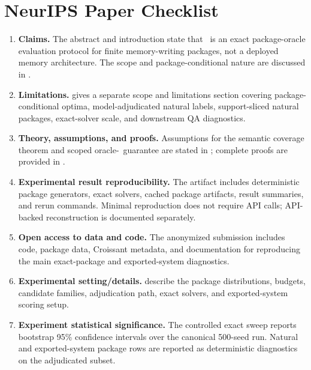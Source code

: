 \section*{NeurIPS Paper Checklist}

\begin{enumerate}[leftmargin=1.5em,itemsep=4pt]
\item \textbf{Claims.} \answerYes{} The abstract and introduction state that \method\ is an exact package-oracle evaluation protocol for finite memory-writing packages, not a deployed memory architecture. The scope and package-conditional nature are discussed in .

\item \textbf{Limitations.} \answerYes{}  gives a separate scope and limitations section covering package-conditional optima, model-adjudicated natural labels, support-sliced natural packages, exact-solver scale, and downstream QA diagnostics.

\item \textbf{Theory, assumptions, and proofs.} \answerYes{} Assumptions for the semantic coverage theorem and scoped oracle-\compiler\ guarantee are stated in ; complete proofs are provided in .

\item \textbf{Experimental result reproducibility.} \answerYes{} The artifact includes deterministic package generators, exact solvers, cached package artifacts, result summaries, and rerun commands. Minimal reproduction does not require API calls; API-backed reconstruction is documented separately.

\item \textbf{Open access to data and code.} \answerYes{} The anonymized submission includes code, package data, Croissant metadata, and documentation for reproducing the main exact-package and exported-system diagnostics.

\item \textbf{Experimental setting/details.} \answerYes{}  describe the package distributions, budgets, candidate families, adjudication path, exact solvers, and exported-system scoring setup.

\item \textbf{Experiment statistical significance.} \answerYes{} The controlled exact sweep reports bootstrap 95\% confidence intervals over the canonical 500-seed run. Natural and exported-system package rows are reported as deterministic diagnostics on the adjudicated subset.


\end{enumerate}
